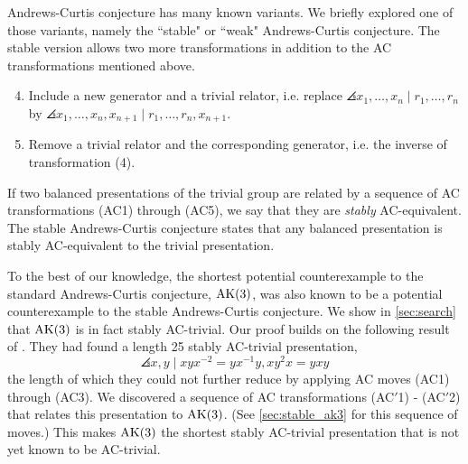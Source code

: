 Andrews-Curtis conjecture has many known variants. We briefly explored one of those variants, namely the ``stable" or ``weak" Andrews-Curtis conjecture.
The stable version allows two more transformations in addition to the AC transformations mentioned above. 

\begin{enumerate}[label=(AC\arabic*)]
	\setcounter{enumi}{3}
	\item Include a new generator and a trivial relator, i.e. replace $\angles{x_1, \dots, x_n \mid r_1, \dots, r_n}$ by $\angles{x_1, \dots, x_n, x_{n+1} \mid r_1, \dots, r_n, x_{n+1}}$.
	\item Remove a trivial relator and the corresponding generator, i.e. the inverse of transformation (4). 
\end{enumerate}

If two balanced presentations of the trivial group are related by a sequence of AC transformations (AC1) through (AC5), we say that they are \textit{stably} AC-equivalent. The stable Andrews-Curtis conjecture states that any balanced presentation is stably AC-equivalent to the trivial presentation. 
\newline 

To the best of our knowledge, the shortest potential counterexample to the standard Andrews-Curtis conjecture, $\text{AK}(3)$, was also known to be a potential counterexample to the stable Andrews-Curtis conjecture. We show in  \autoref{sec:search} that $\text{AK}(3)$ is in fact stably AC-trivial. Our proof builds on the following result of \cite{MMS}. They had found a length 25 stably AC-trivial presentation,
\[
\angles{x, y \mid x y x^{-2} = y x^{-1} y, xy^2 x = y x y}
\]
the length of which they could not further reduce by applying AC moves (AC1) through (AC3).  We discovered a sequence of AC transformations (AC$'$1) - (AC$'$2) that relates this presentation to $\text{AK}(3)$. (See \autoref{sec:stable_ak3} for this sequence of moves.) This makes $\text{AK}(3)$ the shortest stably AC-trivial presentation that is not yet known to be AC-trivial.
 
 
